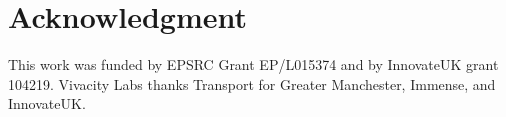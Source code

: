 \documentclass[a4paper, conference]{IEEEtran}
\begin{document}
%




\vspace{-1mm}
\section*{Acknowledgment}
\vspace{-1mm}

This work was funded by EPSRC Grant EP/L015374 and by InnovateUK grant 104219. 
Vivacity Labs thanks Transport for Greater Manchester, Immense, and InnovateUK.





\end{document}
